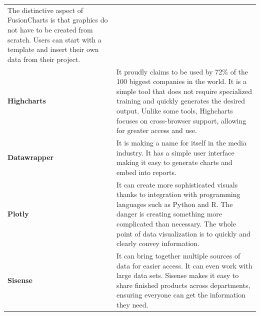 \documentclass[]{book}
\theoremstyle{definition}
\theoremstyle{definition}
\theoremstyle{definition}
\theoremstyle{remark}
\begin{document}
\begin{longtable}[]{@{}ll@{}}
\begin{minipage}[t]{0.78\columnwidth}
The distinctive aspect of FusionCharts is that graphics do not have to
be created from scratch. Users can start with a template and insert
their own data from their project.\strut
\end{minipage}\tabularnewline
\begin{minipage}[t]{0.16\columnwidth}\raggedright\strut
\textbf{Highcharts}\strut
\end{minipage} & \begin{minipage}[t]{0.78\columnwidth}\raggedright\strut
It proudly claims to be used by 72\% of the 100 biggest companies in the
world. It is a simple tool that does not require specialized training
and quickly generates the desired output. Unlike some tools, Highcharts
focuses on cross-browser support, allowing for greater access and
use.\strut
\end{minipage}\tabularnewline
\begin{minipage}[t]{0.16\columnwidth}\raggedright\strut
\textbf{Datawrapper}\strut
\end{minipage} & \begin{minipage}[t]{0.78\columnwidth}\raggedright\strut
It is making a name for itself in the media industry. It has a simple
user interface making it easy to generate charts and embed into
reports.\strut
\end{minipage}\tabularnewline
\begin{minipage}[t]{0.16\columnwidth}\raggedright\strut
\textbf{Plotly}\strut
\end{minipage} & \begin{minipage}[t]{0.78\columnwidth}\raggedright\strut
It can create more sophisticated visuals thanks to integration with
programming languages such as Python and R. The danger is creating
something more complicated than necessary. The whole point of data
visualization is to quickly and clearly convey information.\strut
\end{minipage}\tabularnewline
\begin{minipage}[t]{0.16\columnwidth}\raggedright\strut
\textbf{Sisense}\strut
\end{minipage} & \begin{minipage}[t]{0.78\columnwidth}\raggedright\strut
It can bring together multiple sources of data for easier access. It can
even work with large data sets. Sisense makes it easy to share finished
products across departments, ensuring everyone can get the information
they need.\strut
\end{minipage}\tabularnewline
\bottomrule
\end{longtable}
\end{document}
